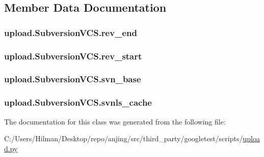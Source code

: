 \subsection{Member Data Documentation}
\hypertarget{classupload_1_1_subversion_v_c_s_ac0bb07a099c722b7f8622de4b225904f}{}
\subsubsection[{rev\+\_\+end}]{\setlength{\rightskip}{0pt plus 5cm}upload.\+Subversion\+V\+C\+S.\+rev\+\_\+end}\label{classupload_1_1_subversion_v_c_s_ac0bb07a099c722b7f8622de4b225904f}
\hypertarget{classupload_1_1_subversion_v_c_s_ad1553a69f4a790309273dbdeb9077732}{}
\subsubsection[{rev\+\_\+start}]{\setlength{\rightskip}{0pt plus 5cm}upload.\+Subversion\+V\+C\+S.\+rev\+\_\+start}\label{classupload_1_1_subversion_v_c_s_ad1553a69f4a790309273dbdeb9077732}
\hypertarget{classupload_1_1_subversion_v_c_s_a60645c40d2fea4cd52881576bd13341f}{}
\subsubsection[{svn\+\_\+base}]{\setlength{\rightskip}{0pt plus 5cm}upload.\+Subversion\+V\+C\+S.\+svn\+\_\+base}\label{classupload_1_1_subversion_v_c_s_a60645c40d2fea4cd52881576bd13341f}
\hypertarget{classupload_1_1_subversion_v_c_s_aa801782f807674b06f491df5d7ca9942}{}
\subsubsection[{svnls\+\_\+cache}]{\setlength{\rightskip}{0pt plus 5cm}upload.\+Subversion\+V\+C\+S.\+svnls\+\_\+cache}\label{classupload_1_1_subversion_v_c_s_aa801782f807674b06f491df5d7ca9942}


The documentation for this class was generated from the following file\+:\begin{DoxyCompactItemize}
\item 
C\+:/\+Users/\+Hilman/\+Desktop/repo/anjing/src/third\+\_\+party/googletest/scripts/\hyperlink{upload_8py}{upload.\+py}\end{DoxyCompactItemize}
